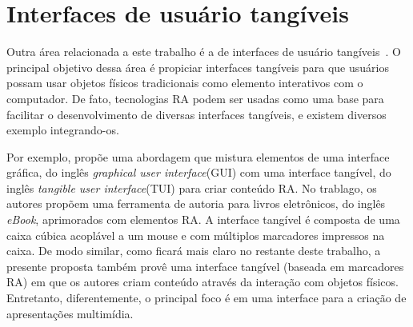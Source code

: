 \documentclass[../main.tex]{subfiles}
\begin{document}
\section{Interfaces de usuário tangíveis}
\label{sec:interfaces_tangiveis}

Outra área relacionada a este trabalho é a de interfaces de usuário tangíveis~\cite{ishii_tangible_2008}. O principal objetivo dessa área é propiciar interfaces tangíveis para que usuários possam usar objetos físicos tradicionais como elemento interativos com o computador. De fato, tecnologias RA podem ser usadas como uma base para facilitar o desenvolvimento de diversas interfaces tangíveis, e existem diversos exemplo integrando-os. 

Por exemplo,  propõe uma abordagem que mistura elementos de uma interface gráfica, do inglês \emph{graphical user interface}(GUI) com uma interface tangível, do inglês \emph{tangible user interface}(TUI) para criar conteúdo RA. No trablago, os autores propõem uma ferramenta de autoria para livros eletrônicos, do inglês \emph{eBook}, aprimorados com elementos RA. A interface tangível é composta de uma caixa cúbica acoplável a um mouse e com múltiplos marcadores impressos na caixa. De modo similar, como ficará mais claro no restante deste trabalho, a presente proposta também provê uma interface tangível (baseada em marcadores RA) em que os autores criam conteúdo através da interação com objetos físicos. Entretanto, diferentemente, o principal foco é em uma interface para a criação de apresentações multimídia.
\end{document}
